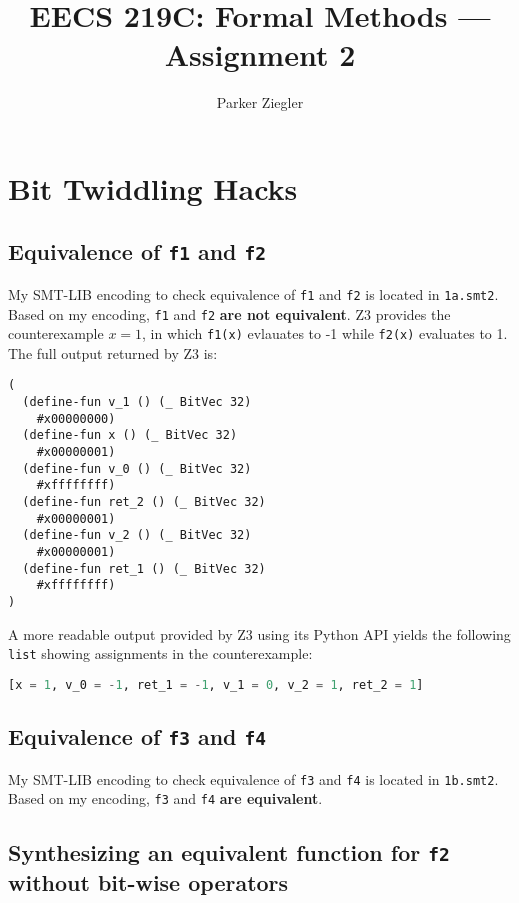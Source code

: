\documentclass{article}
\title{EECS 219C: Formal Methods — Assignment 2}
\author{Parker Ziegler}
\newcommand{\code}[1]{\texttt{#1}}
\begin{document}
\maketitle

\section{Bit Twiddling Hacks}

\subsection{Equivalence of \code{f1} and \code{f2}}

\noindent My SMT-LIB encoding to check equivalence of \code{f1} and \code{f2} is located in \code{1a.smt2}. Based on my encoding, \code{f1} and \code{f2} \textbf{are not equivalent}. Z3 provides the counterexample $x = 1$, in which \code{f1(x)} evlauates to -1 while \code{f2(x)} evaluates to 1. The full output returned by Z3 is:

\begin{lstlisting}
(
  (define-fun v_1 () (_ BitVec 32)
    #x00000000)
  (define-fun x () (_ BitVec 32)
    #x00000001)
  (define-fun v_0 () (_ BitVec 32)
    #xffffffff)
  (define-fun ret_2 () (_ BitVec 32)
    #x00000001)
  (define-fun v_2 () (_ BitVec 32)
    #x00000001)
  (define-fun ret_1 () (_ BitVec 32)
    #xffffffff)
)
\end{lstlisting}

\noindent A more readable output provided by Z3 using its Python API yields the following \code{list} showing assignments in the counterexample:

\begin{lstlisting}[language=Python]
[x = 1, v_0 = -1, ret_1 = -1, v_1 = 0, v_2 = 1, ret_2 = 1]
\end{lstlisting}

\subsection{Equivalence of \code{f3} and \code{f4}}

\noindent My SMT-LIB encoding to check equivalence of \code{f3} and \code{f4} is located in \code{1b.smt2}. Based on my encoding, \code{f3} and \code{f4} \textbf{are equivalent}.

\subsection{Synthesizing an equivalent function for \code{f2} without bit-wise operators}
\end{document}
